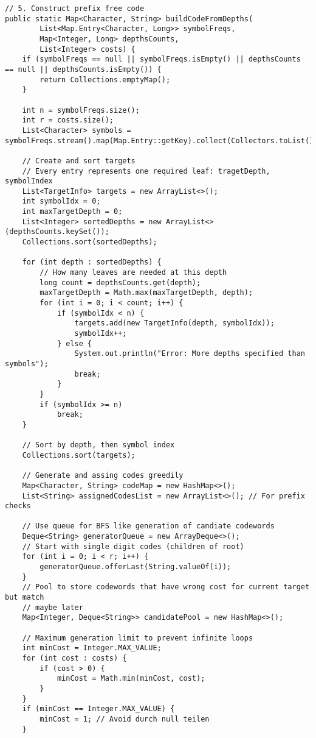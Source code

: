 \documentclass[a4paper,10pt,ngerman]{scrartcl}
\begin{document}
\begin{lstlisting}
// 5. Construct prefix free code
public static Map<Character, String> buildCodeFromDepths(
        List<Map.Entry<Character, Long>> symbolFreqs,
        Map<Integer, Long> depthsCounts,
        List<Integer> costs) {
    if (symbolFreqs == null || symbolFreqs.isEmpty() || depthsCounts == null || depthsCounts.isEmpty()) {
        return Collections.emptyMap();
    }

    int n = symbolFreqs.size();
    int r = costs.size();
    List<Character> symbols = symbolFreqs.stream().map(Map.Entry::getKey).collect(Collectors.toList());

    // Create and sort targets
    // Every entry represents one required leaf: tragetDepth, symbolIndex
    List<TargetInfo> targets = new ArrayList<>();
    int symbolIdx = 0;
    int maxTargetDepth = 0;
    List<Integer> sortedDepths = new ArrayList<>(depthsCounts.keySet());
    Collections.sort(sortedDepths);

    for (int depth : sortedDepths) {
        // How many leaves are needed at this depth
        long count = depthsCounts.get(depth);
        maxTargetDepth = Math.max(maxTargetDepth, depth);
        for (int i = 0; i < count; i++) {
            if (symbolIdx < n) {
                targets.add(new TargetInfo(depth, symbolIdx));
                symbolIdx++;
            } else {
                System.out.println("Error: More depths specified than symbols");
                break;
            }
        }
        if (symbolIdx >= n)
            break;
    }

    // Sort by depth, then symbol index
    Collections.sort(targets);

    // Generate and assing codes greedily
    Map<Character, String> codeMap = new HashMap<>();
    List<String> assignedCodesList = new ArrayList<>(); // For prefix checks

    // Use queue for BFS like generation of candiate codewords
    Deque<String> generatorQueue = new ArrayDeque<>();
    // Start with single digit codes (children of root)
    for (int i = 0; i < r; i++) {
        generatorQueue.offerLast(String.valueOf(i));
    }
    // Pool to store codewords that have wrong cost for current target but match
    // maybe later
    Map<Integer, Deque<String>> candidatePool = new HashMap<>();

    // Maximum generation limit to prevent infinite loops
    int minCost = Integer.MAX_VALUE;
    for (int cost : costs) {
        if (cost > 0) {
            minCost = Math.min(minCost, cost);
        }
    }
    if (minCost == Integer.MAX_VALUE) {
        minCost = 1; // Avoid durch null teilen
    }


\end{lstlisting}
\end{document}
